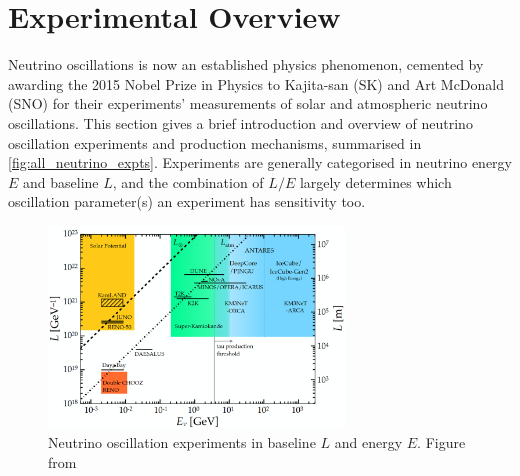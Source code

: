 \section{Experimental Overview}
\label{sec:exp_overview}
Neutrino oscillations is now an established physics phenomenon, cemented by awarding the 2015 Nobel Prize in Physics to Kajita-san (SK) and Art McDonald (SNO) for their experiments' measurements of solar and atmospheric neutrino oscillations. This section gives a brief introduction and overview of neutrino oscillation experiments and production mechanisms, summarised in \autoref{fig:all_neutrino_expts}. Experiments are generally categorised in neutrino energy $E$ and baseline $L$, and the combination of $L/E$ largely determines which oscillation parameter(s) an experiment has sensitivity too.
\begin{figure}[h]
	\includegraphics[width=0.7\textwidth, trim={0mm 0mm 0mm 0mm}, clip,page=1]{figures/theory/le_experiments}
	\caption{Neutrino oscillation experiments in baseline $L$ and energy $E$. Figure from \cite{ic_neutrino_2018}}
	\label{fig:all_neutrino_expts}
\end{figure}

